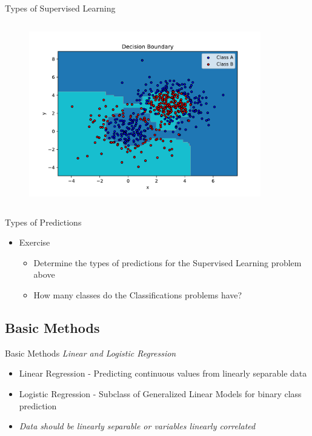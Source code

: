 \documentclass[10pt]{beamer}
\begin{document}
\begin{frame}{Types of Supervised Learning}
\begin{columns}
\begin{column}{0.5\textwidth}
\begin{figure}
		\includegraphics[width=0.9\textwidth, center, trim=0cm 0cm 0 0cm]{images/Classification.pdf}
	\end{figure}
	\end{column}
	\end{columns}
\end{frame}

\begin{frame}{Types of Predictions}  
	\begin{itemize}
		\item Exercise
			\begin{itemize}
				\item Determine the types of predictions for the Supervised Learning problem above
				\pause
				\item How many classes do the Classifications problems have?
			\end{itemize}
	\end{itemize}
\end{frame}

\subsection{Basic Methods}

\begin{frame}{Basic Methods}
\emph{Linear and Logistic Regression}
	\begin{itemize}
		\item Linear Regression - Predicting continuous values from linearly separable data
		\pause
		\item Logistic Regression - Subclass of Generalized Linear Models for binary class prediction
	   \pause
       \item \emph{Data \alert{should} be linearly separable or variables linearly correlated}
	\end{itemize}
\end{frame}
\end{document}
